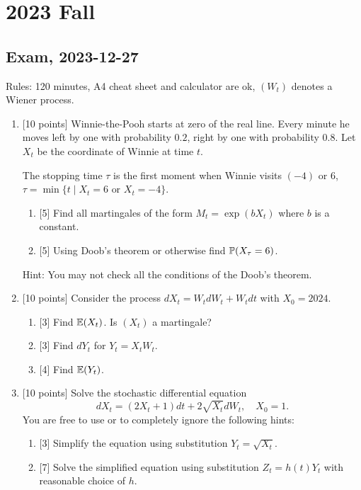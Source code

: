 \documentclass[12pt, a4paper]{article}
\begin{document}
\section{2023 Fall}

\subsection{Exam, 2023-12-27}

Rules: 120 minutes, A4 cheat sheet and calculator are ok, $(W_t)$ denotes a Wiener process.

\begin{enumerate}

\item {[10 points]} Winnie-the-Pooh starts at zero of the real line. 
Every minute he moves left by one with probability $0.2$, right by one with probability $0.8$.
Let $X_t$ be the coordinate of Winnie at time $t$.

The stopping time $\tau$ is the first moment when Winnie visits $(-4)$ or $6$, 
$\tau = \min\{t \mid X_t = 6 \text{ or } X_t = -4\}$.

\begin{enumerate}
    \item {[5]} Find all martingales of the form $M_t = \exp(b X_t)$ where $b$ is a constant.
    \item {[5]} Using Doob's theorem or otherwise find $\P(X_{\tau} = 6)$.
\end{enumerate}

Hint: You may not check all the conditions of the Doob's theorem.

\item {[10 points]} Consider the process $dX_t = W_t dW_t + W_t dt$ with $X_0 = 2024$.
\begin{enumerate}
    \item {[3]} Find $\E(X_t)$. Is $(X_t)$ a martingale?
    \item {[3]} Find $dY_t$ for $Y_t = X_t W_t$.
    \item {[4]} Find $\E(Y_t)$.
\end{enumerate}

    
\item {[10 points]} Solve the stochastic differential equation 
\[
dX_t = (2X_t + 1)dt + 2\sqrt{X_t}dW_t, \quad X_0 = 1.    
\]
You are free to use or to completely ignore the following hints:
\begin{enumerate}
    \item {[3]} Simplify the equation using substitution $Y_t = \sqrt{X_t}$.
    \item {[7]} Solve the simplified equation using substitution $Z_t = h(t) Y_t$ with reasonable choice of $h$.
\end{enumerate}


\end{enumerate}
\end{document}
